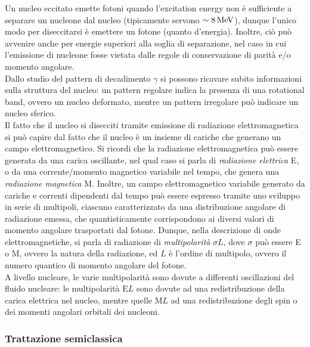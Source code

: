 Un nucleo eccitato emette fotoni quando l'excitation energy non è sufficiente a separare un nucleone dal nucleo (tipicamente servono $ \sim 8\,\mathrm{MeV} $), dunque l'unico modo per diseccitarsi è emettere un fotone (quanto d'energia). Inoltre, ciò può avvenire anche per energie superiori alla soglia di separazione, nel caso in cui l'emissione di nucleone fosse vietata dalle regole di conservazione di parità e/o momento angolare.\\
Dallo studio del pattern di decadimento $ \gamma $ si possono ricavare subito informazioni sulla struttura del nucleo: un pattern regolare indica la presenza di una rotational band, ovvero un nucleo deformato, mentre un pattern irregolare può indicare un nucleo sferico.\\
Il fatto che il nucleo si disecciti tramite emissione di radiazione elettromagnetica si può capire dal fatto che il nucleo è un insieme di cariche che generano un campo elettromagnetico. Si ricordi che la radiazione elettromagnetica può essere generata da una carica oscillante, nel qual caso si parla di \textit{radiazione elettrica} E, o da una corrente/momento magnetico variabile nel tempo, che genera una \textit{radiazione magnetica} M. Inoltre, un campo elettromagnetico variabile generato da cariche e correnti dipendenti dal tempo può essere espresso tramite uno sviluppo in serie di multipoli, ciascuno caratterizzato da una distribuzione angolare di radiazione emessa, che quantisticamente corrispondono ai diversi valori di momento angolare trasportati dal fotone. Dunque, nella descrizione di onde elettromagnetiche, si parla di radiazione di \textit{multipolarità} $ \sigma L $, dove $ \sigma $ può essere E o M, ovvero la natura della radiazione, ed $ L $ è l'ordine di multipolo, ovvero il numero quantico di momento angolare del fotone.\\
A livello nucleare, le varie multipolarità sono dovute a differenti oscillazioni del fluido nucleare: le multipolarità $ \text{E}L $ sono dovute ad una redistribuzione della carica elettrica nel nucleo, mentre quelle $ \text{M}L $ ad una redistribuzione degli spin o dei momenti angolari orbitali dei nucleoni.

\subsubsection{Trattazione semiclassica}

